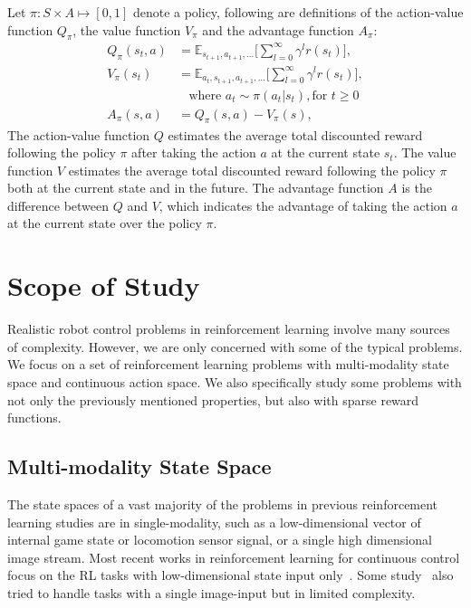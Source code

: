 Let $\pi : S \times A \mapsto [0,1] $ denote a policy, following are definitions of the action-value function $Q_\pi $, the value function $V_\pi $ and the advantage function $A_\pi $:
\begin{align}
Q_\pi(s_t,a) &= \mathbb{E}_{s_{t+1},a_{t+1},\ldots}
\big[ \sum_{l=0}^\infty \gamma^l r(s_{t}) \big], \\
V_\pi(s_t) &= \mathbb{E}_{a_{t},s_{t+1},a_{t+1},\ldots}
\big[ \sum_{l=0}^\infty \gamma^l  r(s_{t}) \big],\\
& \ \ \ \ \text{where } a_t \sim \pi (a_t|s_t), \text{for } t \geq 0  \\
A_\pi (s,a) &= Q_\pi (s,a) - V_\pi (s), 
\end{align}
The action-value function $Q$ estimates the average total discounted reward following the policy $\pi$ after taking the action $a$ at the current state $s_t$. The value function $V$ estimates the average total discounted reward following the policy $\pi$ both at the current state and in the future. The advantage function $A$ is the difference between $Q$ and $V$, which indicates the advantage of taking the action $a$ at the current state over the policy $\pi$.




\section{Scope of Study}
Realistic robot control problems in reinforcement learning involve many sources of complexity. However, we are only concerned with some of the typical problems.
We focus on a set of reinforcement learning problems with multi-modality state space and continuous action space. We also specifically study some problems with not only the previously mentioned properties, but also with sparse reward functions.

\subsection{Multi-modality State Space}

The state spaces of a vast majority of the problems in previous reinforcement learning studies are in single-modality, such as a low-dimensional vector of internal game state or locomotion sensor signal, or a single high dimensional image stream. Most recent works in reinforcement learning for continuous control focus on the RL tasks with low-dimensional state input only~\cite{duan2016benchmarking}. Some study~\cite{wu2017scalable} also tried to handle tasks with a single image-input but in limited complexity.

